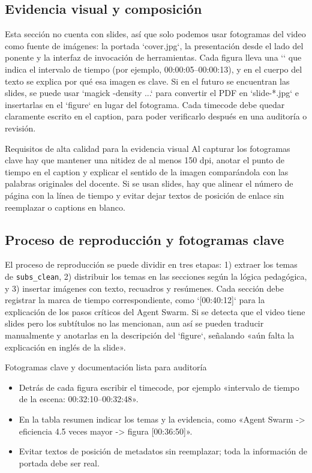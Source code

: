 \subsection{Evidencia visual y composición}
Esta sección no cuenta con slides, así que solo podemos usar fotogramas del video como fuente de imágenes: la portada `cover.jpg`, la presentación desde el lado del ponente y la interfaz de invocación de herramientas. Cada figura lleva una `\protect\footnotemark` que indica el intervalo de tiempo (por ejemplo, 00:00:05--00:00:13), y en el cuerpo del texto se explica por qué esa imagen es clave. Si en el futuro se encuentran las slides, se puede usar `magick -density ...` para convertir el PDF en `slide-*.jpg` e insertarlas en el `figure` en lugar del fotograma. Cada timecode debe quedar claramente escrito en el caption, para poder verificarlo después en una auditoría o revisión.

\begin{importantbox}{Requisitos de alta calidad para la evidencia visual}
Al capturar los fotogramas clave hay que mantener una nitidez de al menos 150 dpi, anotar el punto de tiempo en el caption y explicar el sentido de la imagen comparándola con las palabras originales del docente. Si se usan slides, hay que alinear el número de página con la línea de tiempo y evitar dejar textos de posición de enlace sin reemplazar o captions en blanco.
\end{importantbox}

\subsection{Proceso de reproducción y fotogramas clave}
El proceso de reproducción se puede dividir en tres etapas: 1) extraer los temas de \texttt{subs\_clean}, 2) distribuir los temas en las secciones según la lógica pedagógica, y 3) insertar imágenes con texto, recuadros y resúmenes. Cada sección debe registrar la marca de tiempo correspondiente, como `[00:40:12]` para la explicación de los pasos críticos del Agent Swarm. Si se detecta que el video tiene slides pero los subtítulos no las mencionan, aun así se pueden traducir manualmente y anotarlas en la descripción del `figure`, señalando «aún falta la explicación en inglés de la slide».

\begin{knowledgebox}{Fotogramas clave y documentación lista para auditoría}
\begin{itemize}
    \item Detrás de cada figura escribir el timecode, por ejemplo «intervalo de tiempo de la escena: 00:32:10--00:32:48».
    \item En la tabla resumen indicar los temas y la evidencia, como «Agent Swarm -> eficiencia 4.5 veces mayor -> figura [00:36:50]».
    \item Evitar textos de posición de metadatos sin reemplazar; toda la información de portada debe ser real.
\end{itemize}
\end{knowledgebox}

